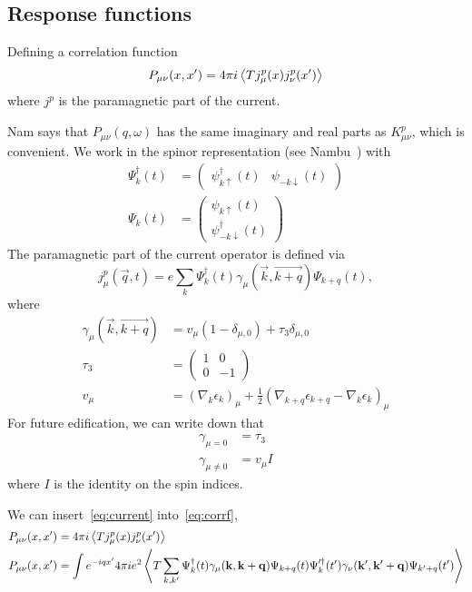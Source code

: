 \documentclass[../main.tex]{subfiles}
\begin{document}
	\subsection{Response functions} \label{subsec:}

	Defining a correlation function
	\begin{equation}
		P_{\mu\nu}(x, x') = 4 \pi i \ev{T j_\mu^p(x) j_\nu^p(x')} \label{eq:corrf}
	\end{equation}
	where $j^p$ is the paramagnetic part of the current.

	Nam says that $P_{\mu\nu}(q, \omega)$ has the same imaginary and real parts as $K_{\mu\nu}^p$, which is convenient.
	We work in the spinor representation (see Nambu~\autocite{Nambu1960}) with
	\begin{align}
		\Psi_k^{\dagger}(t) &= \begin{pmatrix}
							\psi_{k \uparrow}^\dagger(t) & \psi_{-k \downarrow}(t)
			\end{pmatrix} \\
		\Psi_k(t) &= \begin{pmatrix}
								\psi_{k \uparrow}(t) \\
								\psi_{-k \downarrow}^\dagger(t)
		\end{pmatrix}
	\end{align}
	The paramagnetic part of the current operator is defined via
	\begin{equation}
		j_\mu^p(\vec{q}, t) = e \sum_k \Psi_k^{\dagger}(t) \gamma_\mu(\vec{k}, \vec{k + q}) \Psi_{k + q}(t), \label{eq:current}
	\end{equation}
	where
	\begin{align}
		\gamma_\mu(\vec{k}, \vec{k + q}) &= v_\mu \left(1 - \delta_{\mu, 0} \right) + \tau_3 \delta_{\mu, 0} \\
		\tau_3 &= \begin{pmatrix}
					 1 & 0 \\
					 0 & -1
				\end{pmatrix} \\
		v_\mu &= \left( \nabla_k \epsilon_k \right)_\mu + \frac{1}{2}\left( \nabla_{k + q} \epsilon_{k + q} - \nabla_k \epsilon_k \right)_\mu
	\end{align}
	For future edification, we can write down that
	\begin{align}
		\gamma_{\mu = 0} &= \tau_3 \\
		\gamma_{\mu \neq 0} &= v_\mu I
	\end{align}
	where $I$ is the identity on the spin indices.

	We can insert~\eqref{eq:current} into~\eqref{eq:corrf},
	\begin{align}
		P_{\mu\nu}(x, x') &= 4 \pi i \ev{T j_\mu^p(x) j_\nu^p(x')} \\
		P_{\mu\nu}(x, x') &= \int e^{-i q x'} 4 \pi i e^2 \ev{T \sum_{k, k'} \Psi_k^{\dagger}(t) \gamma_\mu(\vec{k}, \vec{k + q}) \Psi_{k + q}(t) \Psi_k'^{\dagger}(t') \gamma_\nu(\vec{k'}, \vec{k' + q}) \Psi_{k' + q}(t')} \\
	\end{align}
\end{document}

